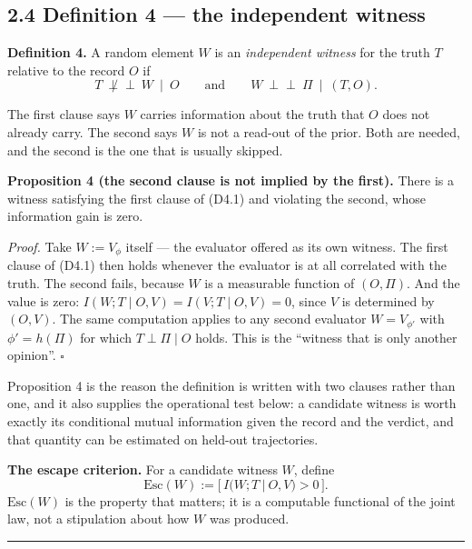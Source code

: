 \documentclass[11pt,a4paper]{article}
\begin{document}
\subsection{2.4 Definition 4 --- the independent witness}\label{definition-4-the-independent-witness}

\textbf{Definition 4.} A random element \(W\) is an \emph{independent witness} for the truth
\(T\) relative to the record \(O\) if
\begin{equation}
T\ \not\perp\!\!\!\perp\ W\ \mid\ O
\qquad\text{and}\qquad
W\ \perp\!\!\!\perp\ \Pi\ \mid\ (T,O).
\tag{D4.1}
\end{equation}

The first clause says \(W\) carries information about the truth that \(O\) does not
already carry. The second says \(W\) is not a read-out of the prior. Both are
needed, and the second is the one that is usually skipped.

\textbf{Proposition 4 (the second clause is not implied by the first).} There is a
witness satisfying the first clause of (D4.1) and violating the second, whose
information gain is zero.

\emph{Proof.} Take \(W:=V_\phi\) itself --- the evaluator offered as its own witness. The
first clause of (D4.1) then holds whenever the evaluator is at all correlated with
the truth. The second fails, because \(W\) is a measurable function of \((O,\Pi)\).
And the value is zero: \(I(W;T\mid O,V)=I(V;T\mid O,V)=0\), since \(V\) is determined
by \((O,V)\). The same computation applies to any second evaluator
\(W=V_{\phi'}\) with \(\phi'=h(\Pi)\) for which \(T\perp\Pi\mid O\) holds. This is the
``witness that is only another opinion''. \(\square\)

Proposition 4 is the reason the definition is written with two clauses rather
than one, and it also supplies the operational test below: a candidate witness is
worth exactly its conditional mutual information given the record and the
verdict, and that quantity can be estimated on held-out trajectories.

\textbf{The escape criterion.} For a candidate witness \(W\), define
\begin{equation}
\mathrm{Esc}(W):=\Big[\,I\big(W;T\ \big|\ O,V\big)>0\,\Big].
\tag{2.4.1}
\end{equation}
\(\mathrm{Esc}(W)\) is the property that matters; it is a computable functional of
the joint law, not a stipulation about how \(W\) was produced.

\begin{center}\rule{0.5\linewidth}{0.5pt}\end{center}
\end{document}
